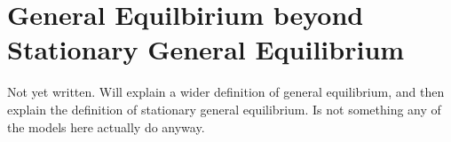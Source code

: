 \section{General Equilbirium beyond Stationary General Equilibrium} \label{app:eqmwithgrowth}
Not yet written. Will explain a wider definition of general equilibrium, and then explain the definition of stationary general equilibrium. Is not something any of the models here actually do anyway.




